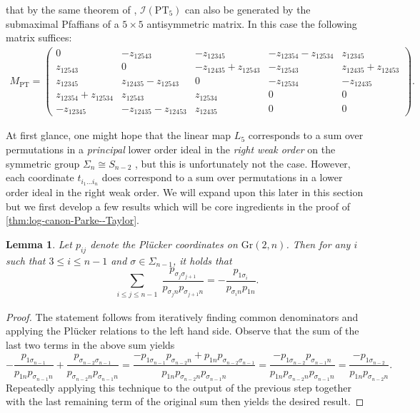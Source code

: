 \documentclass[12pt, reqno]{amsart}
\numberwithin{equation}{section}
\theoremstyle{plain}
\newtheorem{lemma}[theorem]{Lemma}
\theoremstyle{definition}
\newenvironment{example}
  {\pushQED{\qed}\renewcommand{\qedsymbol}{$\triangle$}\examplex}
  {\popQED\endexamplex}
\newcommand{\ci}{\mathcal{I}}
\newcommand{\pt}{\mathrm{PT}}
\newcommand{\gr}{\mathrm{Gr}}
\begin{document}
\begin{example}
that by the same theorem of \cite{buchsbaum1977algebra}, $\ci(\pt_5)$ can also be generated by the submaximal Pfaffians of a $5 \times 5$ antisymmetric matrix. In this case the following matrix suffices:
\begin{align*}
M_\pt = \begin{pmatrix}
0& -z_{12543}& -z_{12345}& -z_{12354}-z_{12534}& z_{12345} \\
z_{12543}& 0& -z_{12435}+z_{12543}& -z_{12543}& z_{12435}+z_{12453} \\
z_{12345}& z_{12435}-z_{12543}& 0& -z_{12534}& -z_{12435} \\ 
z_{12354}+z_{12534}& z_{12543}& z_{12534}& 0& 0 \\
-z_{12345}& -z_{12435}-z_{12453}&z_{12435}& 0& 0
\end{pmatrix}. 
\end{align*}
\end{example}


At first glance, one might hope that the linear map $L_5$ corresponds to a sum over permutations in a \emph{principal} lower order ideal in the \emph{right weak order} on the symmetric group $\Sigma_n \cong S_{n-2}$ \cite{bjornerbrenticoxeter}, but this is unfortunately not the case. However, each coordinate $t_{i_1 \ldots i_n}$ does correspond to a sum over permutations in a lower order ideal in the right weak order. We will expand upon this later in this section but we first develop a few results which will be core ingredients in the proof of \cref{thm:log-canon-Parke--Taylor}. 


\begin{lemma}
\label{lemma:plucker-sum-shuffle}
Let $p_{ij}$ denote the Pl\"ucker coordinates on $\gr(2, n)$. Then for any $i$ such that $3 \leq i \leq n-1$ and $\sigma \in \Sigma_{n-1}$, it holds that
\[
\sum_{\substack{i \leq j \leq n-1}} \frac{p_{\sigma_j \sigma_{j + 1}}}{p_{\sigma_j n}p_{\sigma_{j +1} n}} = -\frac{p_{1 \sigma_i}}{p_{\sigma_i n} p_{1n}}.
\]
\end{lemma}
\begin{proof}
The statement follows from iteratively finding common denominators and applying the Pl\"ucker relations to the left hand side. Observe that the sum of the last two terms in the above sum yields
\[
-\frac{p_{1 \sigma_{n-1}}}{p_{1n} p_{\sigma_{n-1} n}} +  \frac{p_{\sigma_{n-2} \sigma_{n-1}}}{p_{\sigma_{n-2} n } p_{\sigma_{n-1} n}} = \frac{-p_{1 \sigma_{n-1}} p_{\sigma_{n- 2} n} + p_{1 n} p_{\sigma_{n- 2} \sigma_{n - 1}}}{p_{1n} p_{\sigma_{n-2} n } p_{\sigma_{n-1} n}} = \frac{-p_{1 \sigma_{n-2}} p_{\sigma_{n-1} n}}{p_{1n} p_{\sigma_{n-2} n } p_{\sigma_{n-1} n}} =  \frac{-p_{1 \sigma_{n-2}}}{p_{1n} p_{\sigma_{n-2} n }}.
\]
Repeatedly applying this technique to the output of the previous step together with the last remaining term of the original sum then yields the desired result. 
\end{proof}
\end{document}
